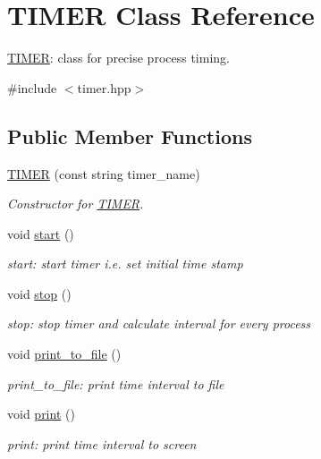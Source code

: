 \hypertarget{classTIMER}{}\section{T\+I\+M\+ER Class Reference}
\label{classTIMER}


\mbox{\hyperlink{classTIMER}{T\+I\+M\+ER}}\+: class for precise process timing.  




{\ttfamily \#include $<$timer.\+hpp$>$}

\subsection*{Public Member Functions}
\begin{DoxyCompactItemize}
\item 
\mbox{\label{classTIMER_ad450210e714b4eb2c825da194fbbe221}} 
\mbox{\hyperlink{classTIMER_ad450210e714b4eb2c825da194fbbe221}{T\+I\+M\+ER}} (const string timer\+\_\+name)
\begin{DoxyCompactList}\small\item\em Constructor for \mbox{\hyperlink{classTIMER}{T\+I\+M\+ER}}. \end{DoxyCompactList}\item 
\mbox{\label{classTIMER_ab32c9692daffab03c61dff31994a4948}} 
void \mbox{\hyperlink{classTIMER_ab32c9692daffab03c61dff31994a4948}{start}} ()
\begin{DoxyCompactList}\small\item\em start\+: start timer i.\+e. set initial time stamp \end{DoxyCompactList}\item 
\mbox{\label{classTIMER_a5ffda48b39188174bbfb287923e8c01e}} 
void \mbox{\hyperlink{classTIMER_a5ffda48b39188174bbfb287923e8c01e}{stop}} ()
\begin{DoxyCompactList}\small\item\em stop\+: stop timer and calculate interval for every process \end{DoxyCompactList}\item 
\mbox{\label{classTIMER_a526fe17e0ba4303230c43b3e5b8e5efe}} 
void \mbox{\hyperlink{classTIMER_a526fe17e0ba4303230c43b3e5b8e5efe}{print\+\_\+to\+\_\+file}} ()
\begin{DoxyCompactList}\small\item\em print\+\_\+to\+\_\+file\+: print time interval to file \end{DoxyCompactList}\item 
\mbox{\label{classTIMER_ad771cc2a3de3cd4535293167e730182d}} 
void \mbox{\hyperlink{classTIMER_ad771cc2a3de3cd4535293167e730182d}{print}} ()
\begin{DoxyCompactList}\small\item\em print\+: print time interval to screen \end{DoxyCompactList}\end{DoxyCompactItemize}


